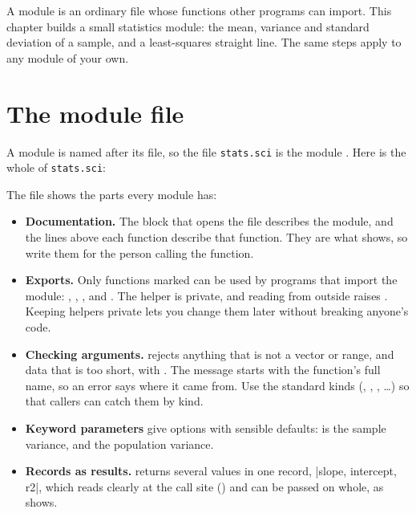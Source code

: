 \documentclass[11pt,a4paper,openany]{report}
\begin{document}
{{A module is an ordinary  file whose functions other programs can
import. This chapter builds a small statistics module: the mean, variance and
standard deviation of a sample, and a least-squares straight line. The same
steps apply to any module of your own.

\section{The module file}

A module is named after its file, so the file \texttt{stats.sci} is the module
. Here is the whole of \texttt{stats.sci}:


The file shows the parts every module has:

\begin{itemize}
\item \textbf{Documentation.} The \code{##} block that opens the file describes
  the module, and the \code{##} lines above each function describe that
  function. They are what  shows, so write them for the person
  calling the function.
\item \textbf{Exports.} Only functions marked  can be used by
  programs that import the module: , , ,
   and . The helper  is private, and
  reading  from outside raises . Keeping
  helpers private lets you change them later without breaking anyone's code.
\item \textbf{Checking arguments.}  rejects anything that is not a
  vector or range, and data that is too short, with
  . The message starts with the function's full name, so an error
  says where it came from. Use the standard kinds (,
  , , \ldots) so that callers can
  catch them by kind.
\item \textbf{Keyword parameters} give options with sensible defaults:
   is the sample variance, and
   the population variance.
\item \textbf{Records as results.}  returns several values in one
  record, \code|{slope, intercept, r2}|, which reads clearly at the call site
  () and can be passed on whole, as  shows.
\end{itemize}

}}
\end{document}
